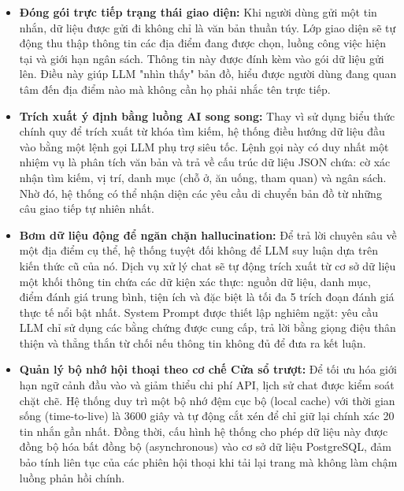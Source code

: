 \documentclass[12pt, a4paper]{article}
\begin{document}
\begin{itemize}
    \item \textbf{Đóng gói trực tiếp trạng thái giao diện:} Khi người dùng gửi một tin nhắn, dữ liệu được gửi đi không chỉ là văn bản thuần túy. Lớp giao diện sẽ tự động thu thập thông tin các địa điểm đang được chọn, luồng công việc hiện tại và giới hạn ngân sách. Thông tin này được đính kèm vào gói dữ liệu gửi lên. Điều này giúp LLM "nhìn thấy" bản đồ, hiểu được người dùng đang quan tâm đến địa điểm nào mà không cần họ phải nhắc tên trực tiếp.
    \item \textbf{Trích xuất ý định bằng luồng AI song song:} Thay vì sử dụng biểu thức chính quy để trích xuất từ khóa tìm kiếm, hệ thống điều hướng dữ liệu đầu vào bằng một lệnh gọi LLM phụ trợ siêu tốc. Lệnh gọi này có duy nhất một nhiệm vụ là phân tích văn bản và trả về cấu trúc dữ liệu JSON chứa: cờ xác nhận tìm kiếm, vị trí, danh mục (chỗ ở, ăn uống, tham quan) và ngân sách. Nhờ đó, hệ thống có thể nhận diện các yêu cầu di chuyển bản đồ từ những câu giao tiếp tự nhiên nhất.
    \item \textbf{Bơm dữ liệu động để ngăn chặn hallucination:} Để trả lời chuyên sâu về một địa điểm cụ thể, hệ thống tuyệt đối không để LLM suy luận dựa trên kiến thức cũ của nó. Dịch vụ xử lý chat sẽ tự động trích xuất từ cơ sở dữ liệu một khối thông tin chứa các dữ kiện xác thực: nguồn dữ liệu, danh mục, điểm đánh giá trung bình, tiện ích và đặc biệt là tối đa 5 trích đoạn đánh giá thực tế nổi bật nhất. System Prompt được thiết lập nghiêm ngặt: yêu cầu LLM chỉ sử dụng các bằng chứng được cung cấp, trả lời bằng giọng điệu thân thiện và thẳng thắn từ chối nếu thông tin không đủ để đưa ra kết luận.
    \item \textbf{Quản lý bộ nhớ hội thoại theo cơ chế Cửa sổ trượt:} Để tối ưu hóa giới hạn ngữ cảnh đầu vào và giảm thiểu chi phí API, lịch sử chat được kiểm soát chặt chẽ. Hệ thống duy trì một bộ nhớ đệm cục bộ (local cache) với thời gian sống (time-to-live) là 3600 giây và tự động cắt xén để chỉ giữ lại chính xác 20 tin nhắn gần nhất. Đồng thời, cấu hình hệ thống cho phép dữ liệu này được đồng bộ hóa bất đồng bộ (asynchronous) vào cơ sở dữ liệu PostgreSQL, đảm bảo tính liên tục của các phiên hội thoại khi tải lại trang mà không làm chậm luồng phản hồi chính.
\end{itemize}
\end{document}
